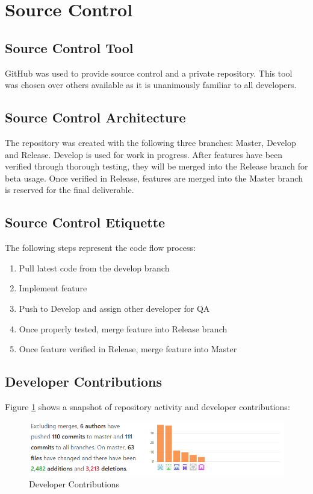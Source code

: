 \section{Source  Control}
\subsection{Source Control Tool}
GitHub was used to provide source control and a private repository. This tool was chosen over others available as it is unanimously familiar to all developers. 

\subsection{Source Control Architecture}
The repository was created with the following three branches: Master, Develop and Release. 
Develop is used for work in progress. After features have been verified through thorough testing, they will be merged into the Release branch for beta usage. Once verified in Release, features are merged into the Master branch is reserved for the final deliverable. 


\subsection{Source Control Etiquette}
The following steps represent the code flow process: 

\begin{enumerate}
\item Pull latest code from the develop branch
\item Implement feature
\item Push to Develop and assign other developer for QA
\item Once properly tested, merge feature into Release branch
\item Once feature verified in Release, merge feature into Master
\end{enumerate}

\subsection{Developer Contributions}
Figure \ref{Contributions} shows a snapshot of repository activity and developer contributions:

\begin{figure}[H]
	\centering
	\includegraphics[width=\textwidth]{Contributions.png}
	\caption{Developer Contributions} 
	\label{Contributions}	
\end{figure}



